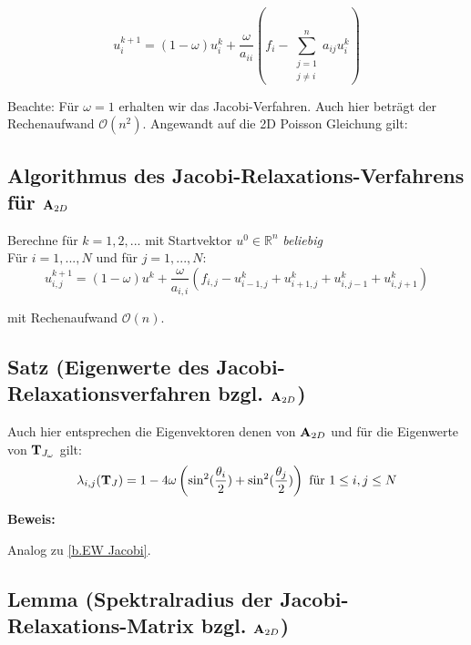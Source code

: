 \begin{equation}
u^{k+1}_{i} = (1 - \omega)u^{k}_{i} + \frac {\omega} {a_{ii}} (f_{i} - \sum_{\substack{j = 1 \\ j \ne i}}^{n} a_{ij}u^{k}_{i})
\end{equation}

Beachte: Für $\omega = 1$ erhalten wir das Jacobi-Verfahren. Auch hier beträgt der Rechenaufwand $\mathcal{O}(n^{2})$. Angewandt auf die 2D Poisson Gleichung gilt:

\subsection{Algorithmus des Jacobi-Relaxations-Verfahrens für ${\textbf{A}}_{2D}$}\label{ss.Algorithmus Jacobi Relax Poisson}

Berechne für $k = 1,2,...$ mit Startvektor $u^{0} \in \mathbb{R}^{n}$ \textit{beliebig}\\
Für $i = 1,...,N$ und für $j = 1,...,N$:
\begin{equation}
u^{k+1}_{i,j} = (1 - \omega)u^{k} + \frac {\omega} {a_{i,i}} (f_{i,j} - u^{k}_{i-1,j} + u^{k}_{i+1,j} + u^{k}_{i,j-1} + u^{k}_{i,j+1})
\end{equation}

mit Rechenaufwand $\mathcal{O}(n)$.

\subsection{Satz (Eigenwerte des Jacobi-Relaxationsverfahren bzgl. ${\textbf{A}}_{2D}$)}\label{ss.EW Relax}

Auch hier entsprechen die Eigenvektoren denen von ${\textbf{A}}_{2D}$ und für die Eigenwerte von ${\textbf{T}}_{J_{\omega}}$ gilt:
\begin{equation}
\lambda_{i,j}({\textbf{T}}_{J}) = 1 - 4 \omega \left(\sin^{2}(\frac {\theta_{i}} {2}) + \sin^{2}(\frac {\theta_{j}} {2}) \right) \textnormal{ für } 1 \le i,j \le N\label{eq.Jacobi-Eigenwerte}
\end{equation}

\textbf{Beweis:}\label{b.Beweis Eigenwerte}

Analog zu \autoref{b.EW Jacobi}.

\subsection{Lemma (Spektralradius der Jacobi-Relaxations-Matrix bzgl. ${\textbf{A}}_{2D}$)}\label{ss.Spektralradius Jacobi Relax}

